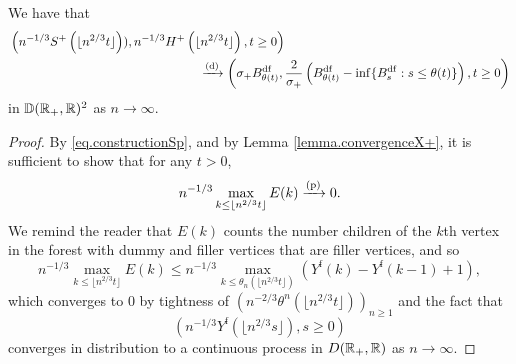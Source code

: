 \begin{lemma}\label{lemma.subtracterrorconverges}
We have that 
\begin{align*}
& \left(n^{-1/3}S^{+}\left(\lfloor n^{2/3}t\rfloor \right)), n^{-1/3}H^{+}\left(\lfloor n^{2/3}t\rfloor \right) ,t\geq 0 \right) \\
& \hspace{15em} \todist \left(\sigma_+ B^{\mathrm{df}}_{\theta (t)},\frac{2}{\sigma_+} \left(B^{\mathrm{df}}_{\theta (t)}-\inf\{B^{\mathrm{df}}_{s}:s\leq \theta(t)\}\right) ,t\geq 0 \right)
\end{align*}
in ${\mathbb D}({\mathbb R}_+,{\mathbb R})^2$ as $n\to \infty$. 
\end{lemma}


\begin{proof}
By \cref{eq.constructionSp}, and by Lemma \ref{lemma.convergenceX+}, it is sufficient to show that for any $t>0$,
$$n^{-1/3}\max_{k\leq \lfloor n^{2/3}t\rfloor}E(k)\xrightarrow[]{\mathrm{(p)}}0.$$
We remind the reader that $E(k)$ counts the number children of the $k$th vertex in the forest with dummy and filler vertices that are filler vertices, and so
$$n^{-1/3}\max_{k\leq \lfloor n^{2/3}t\rfloor}E(k)\leq n^{-1/3}\max_{k\leq \theta_n(\lfloor n^{2/3}t\rfloor)}(Y^{\mathrm{f}}(k)-Y^{\mathrm{f}}(k-1)+1),$$
which converges to $0$ by tightness of $\left(n^{-2/3}\theta^{n}(\lfloor n^{2/3}t\rfloor)\right)_{n\geq 1}$ and the fact that $$\left(n^{-1/3}Y^{\mathrm{f}}\left(\lfloor n^{2/3}s\rfloor\right),s\geq 0\right)$$ converges in distribution to a continuous process in $D({\mathbb R}_+,{\mathbb R})$ as $n\to\infty$.
\end{proof}

